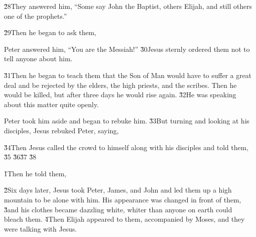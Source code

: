 \v{28}They answered him, ``Some say John the Baptist, others Elijah, and still others one of the prophets.''

\v{29}Then he began to ask them, 

Peter answered him, ``You are the Messiah!'' \v{30}Jesus sternly ordered them not to tell anyone about him.

\v{31}Then he began to teach them that the Son of Man would have to suffer a great deal and be rejected by the elders, the high priests, and the scribes. Then he would be killed, but after three days he would rise again. \v{32}He was speaking about this matter quite openly.

Peter took him aside and began to rebuke him. \v{33}But turning and looking at his disciples, Jesus rebuked Peter, saying, \red{,}

\v{34}Then Jesus called the crowd to himself along with his disciples and told them, \red{,} \v{35} \v{36}\v{37} \v{38}

\v{1}Then he told them,  

\v{2}Six days later, Jesus took Peter, James, and John and led them up a high mountain to be alone with him. His appearance was changed in front of them, \v{3}and his clothes became dazzling white, whiter than anyone on earth could bleach them. \v{4}Then Elijah appeared to them, accompanied by Moses, and they were talking with Jesus.

